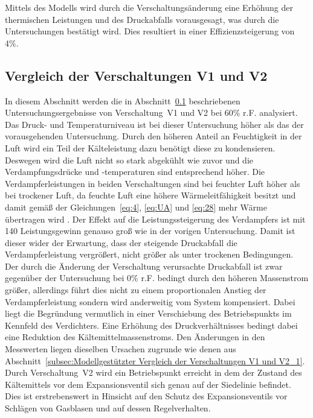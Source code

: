 Mittels des Modells wird durch die Verschaltungsänderung eine Erhöhung der thermischen Leistungen und des Druckabfalls vorausgesagt, was durch die Untersuchungen bestätigt wird. Dies resultiert in einer Effizienzsteigerung von \unit{4}{\%}. 

\subsection{Vergleich der Verschaltungen V1 und V2}
\label{subsec:Vergleich der Verschaltungen V1 und V2_1}

In diesem Abschnitt werden die in Abschnitt~\ref{subsec:Vergleich der Verschaltungen V1 und V2_1} beschriebenen Untersuchungsergebnisse von Verschaltung~V1 und V2 bei \unit{60}{\%} r.F. analysiert.
Das Druck- und Temperaturniveau ist bei dieser Untersuchung höher als das der vorausgehenden Untersuchung. Durch den höheren Anteil an Feuchtigkeit in der Luft wird ein Teil der Kälteleistung dazu benötigt diese zu kondensieren. Deswegen wird die Luft nicht so stark abgekühlt wie zuvor und die Verdampfungsdrücke und -temperaturen sind entsprechend höher. Die Verdampferleistungen in beiden Verschaltungen sind bei feuchter Luft höher als bei trockener Luft, da feuchte Luft eine höhere Wärmeleitfähigkeit besitzt und damit gemäß der Gleichungen~\ref{eq:4}, \ref{eq:UA} und \ref{eq:28} mehr Wärme übertragen wird \cite{Lasance.2003}. Der Effekt auf die Leistungssteigerung des Verdampfers ist mit \unit{140}{\watt} Leistungsgewinn genauso groß wie in der vorigen Untersuchung. Damit ist dieser wider der Erwartung, dass der steigende Druckabfall die Verdampferleistung vergrößert, nicht größer als unter trockenen Bedingungen. Der durch die Änderung der Verschaltung verursachte Druckabfall ist zwar gegenüber der Untersuchung bei \unit{0}{\%} r.F. bedingt durch den höheren Massenstrom größer, allerdings führt dies nicht zu einem proportionalen Anstieg der Verdampferleistung sondern wird anderweitig vom System kompensiert. Dabei liegt die Begründung vermutlich in einer Verschiebung des Betriebspunkts im Kennfeld des Verdichters. Eine Erhöhung des Druckverhältnisses bedingt dabei eine Reduktion des Kältemittelmassenstroms.
Den Änderungen in den Messwerten liegen dieselben Ursachen zugrunde wie denen aus Abschnitt~\ref{subsec:Modellgestützter Vergleich der Verschaltungen V1 und V2_1}.
Durch Verschaltung~V2 wird ein Betriebspunkt erreicht in dem der Zustand des Kältemittels vor dem Expansionsventil sich genau auf der Siedelinie befindet. 
Dies ist erstrebenswert in Hinsicht auf den Schutz des Expansionsventils vor Schlägen von Gasblasen und auf dessen Regelverhalten. \newline
